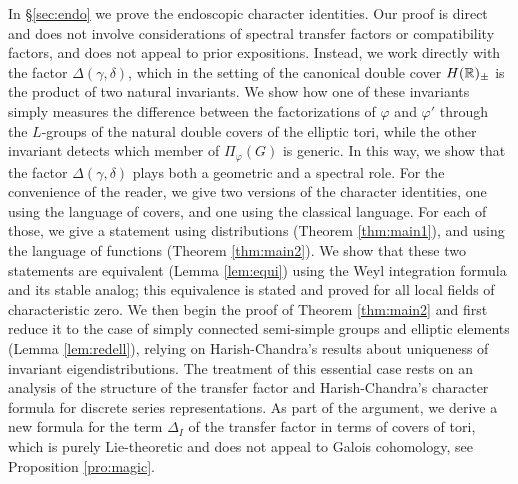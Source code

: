 \documentclass{article}
\theoremstyle{definition}
\numberwithin{equation}{section}
\renewcommand{\-}{\hyp{}}
\begin{document}
In \S\ref{sec:endo} we prove the endoscopic character identities. Our proof is direct and does not involve considerations of spectral transfer factors or compatibility factors, and does not appeal to prior expositions. Instead, we work directly with the factor $\Delta(\gamma,\delta)$, which in the setting of the canonical double cover $H(\mathbb{R})_\pm$ is the product of two natural invariants. We show how one of these invariants simply measures the difference between the factorizations of $\varphi$ and $\varphi'$ through the $L$\-groups of the natural double covers of the elliptic tori, while the other invariant detects which member of $\Pi_\varphi(G)$ is generic. In this way, we show that the factor $\Delta(\gamma,\delta)$ plays both a geometric and a spectral role. For the convenience of the reader, we give two versions of the character identities, one using the language of covers, and one using the classical language. For each of those, we give a statement using distributions (Theorem \ref{thm:main1}), and using the language of functions (Theorem \ref{thm:main2}). We show that these two statements are equivalent (Lemma \ref{lem:equi}) using the Weyl integration formula and its stable analog; this equivalence is stated and proved for all local fields of characteristic zero. We then begin the proof of Theorem \ref{thm:main2} and first reduce it to the case of simply connected semi-simple groups and elliptic elements (Lemma \ref{lem:redell}), relying on Harish-Chandra's results about uniqueness of invariant eigendistributions. The treatment of this essential case rests on an analysis of the structure of the transfer factor and Harish-Chandra's character formula for discrete series representations. As part of the argument, we derive a new formula for the term $\Delta_I$ of the transfer factor in terms of covers of tori, which is purely Lie-theoretic and does not appeal to Galois cohomology, see Proposition \ref{pro:magic}.
\end{document}
